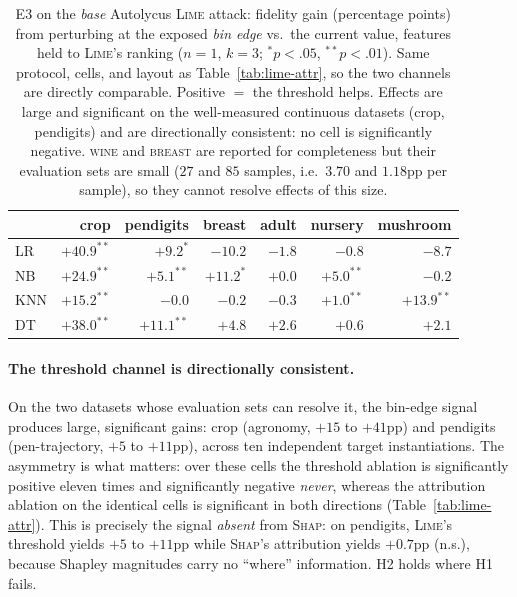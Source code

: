 \documentclass[sigconf,anonymous,review]{acmart}
\begin{document}
\begin{table}[t]
\centering
\caption{E3 on the \emph{base} Autolycus \textsc{Lime} attack: fidelity gain (percentage points) from
perturbing at the exposed \emph{bin edge} vs.\ the current value, features held to \textsc{Lime}'s
ranking ($n{=}1$, $k{=}3$; $^{*}p{<}.05$, $^{**}p{<}.01$). Same protocol, cells, and layout as
Table~\ref{tab:lime-attr}, so the two channels are directly comparable. Positive $=$ the threshold
helps. Effects are large and significant on the well-measured continuous datasets (crop, pendigits)
and are directionally consistent: no cell is significantly negative. \textsc{wine} and
\textsc{breast} are reported for completeness but their evaluation sets are small ($27$ and $85$
samples, i.e.\ $3.70$ and $1.18$pp per sample), so they cannot resolve effects of this size.}
\label{tab:lime-threshold}
\begin{tabular}{lrrrrrr}
\toprule
 & crop & pendigits & breast & adult & nursery & mushroom \\
\midrule
LR  & $+40.9^{**}$ & $+9.2^{*}$   & $-10.2$     & $-1.8$ & $-0.8$      & $-8.7$ \\
NB  & $+24.9^{**}$ & $+5.1^{**}$  & $+11.2^{*}$ & $+0.0$ & $+5.0^{**}$ & $-0.2$ \\
KNN & $+15.2^{**}$ & $-0.0$       & $-0.2$      & $-0.3$ & $+1.0^{**}$ & $+13.9^{**}$ \\
DT  & $+38.0^{**}$ & $+11.1^{**}$ & $+4.8$      & $+2.6$ & $+0.6$      & $+2.1$ \\
\bottomrule
\end{tabular}
\end{table}

\paragraph{The threshold channel is directionally consistent.} On the two datasets whose evaluation
sets can resolve it, the bin-edge signal produces large, significant gains: crop (agronomy, $+15$ to
$+41$pp) and pendigits (pen-trajectory, $+5$ to $+11$pp), across ten independent target
instantiations. The asymmetry is what matters: over these cells the threshold ablation is
significantly positive eleven times and significantly negative \emph{never}, whereas the attribution
ablation on the identical cells is significant in both directions
(Table~\ref{tab:lime-attr}). This is precisely the signal \emph{absent} from \textsc{Shap}: on
pendigits, \textsc{Lime}'s threshold yields $+5$ to $+11$pp while \textsc{Shap}'s attribution yields
$+0.7$pp (n.s.), because Shapley magnitudes carry no ``where'' information. H2 holds where H1 fails.
\end{document}
